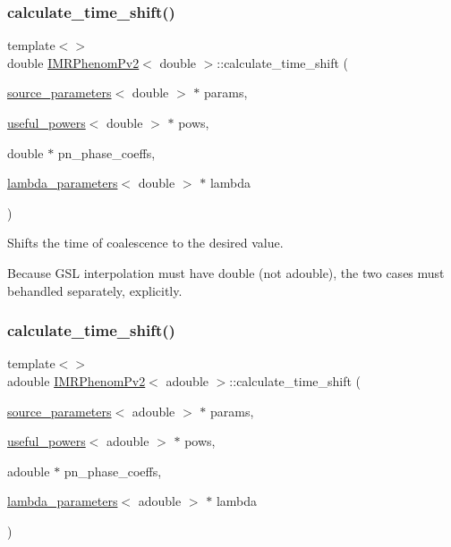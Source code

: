 \subsubsection{\texorpdfstring{calculate\+\_\+time\+\_\+shift()}{calculate\_time\_shift()}\hspace{0.1cm}{\footnotesize\ttfamily [1/2]}}
{\footnotesize\ttfamily template$<$$>$ \\
double \hyperlink{classIMRPhenomPv2}{I\+M\+R\+Phenom\+Pv2}$<$ double $>$\+::calculate\+\_\+time\+\_\+shift (\begin{DoxyParamCaption}\item[{\hyperlink{structsource__parameters}{source\+\_\+parameters}$<$ double $>$ $\ast$}]{params,  }\item[{\hyperlink{structuseful__powers}{useful\+\_\+powers}$<$ double $>$ $\ast$}]{pows,  }\item[{double $\ast$}]{pn\+\_\+phase\+\_\+coeffs,  }\item[{\hyperlink{structlambda__parameters}{lambda\+\_\+parameters}$<$ double $>$ $\ast$}]{lambda }\end{DoxyParamCaption})}



Shifts the time of coalescence to the desired value. 

Because G\+SL interpolation must have double (not adouble), the two cases must behandled separately, explicitly. \mbox{\label{classIMRPhenomPv2_a61ec2bf7f72ec82b5a583e7098b2daab}} 
\subsubsection{\texorpdfstring{calculate\+\_\+time\+\_\+shift()}{calculate\_time\_shift()}\hspace{0.1cm}{\footnotesize\ttfamily [2/2]}}
{\footnotesize\ttfamily template$<$$>$ \\
adouble \hyperlink{classIMRPhenomPv2}{I\+M\+R\+Phenom\+Pv2}$<$ adouble $>$\+::calculate\+\_\+time\+\_\+shift (\begin{DoxyParamCaption}\item[{\hyperlink{structsource__parameters}{source\+\_\+parameters}$<$ adouble $>$ $\ast$}]{params,  }\item[{\hyperlink{structuseful__powers}{useful\+\_\+powers}$<$ adouble $>$ $\ast$}]{pows,  }\item[{adouble $\ast$}]{pn\+\_\+phase\+\_\+coeffs,  }\item[{\hyperlink{structlambda__parameters}{lambda\+\_\+parameters}$<$ adouble $>$ $\ast$}]{lambda }\end{DoxyParamCaption})}



